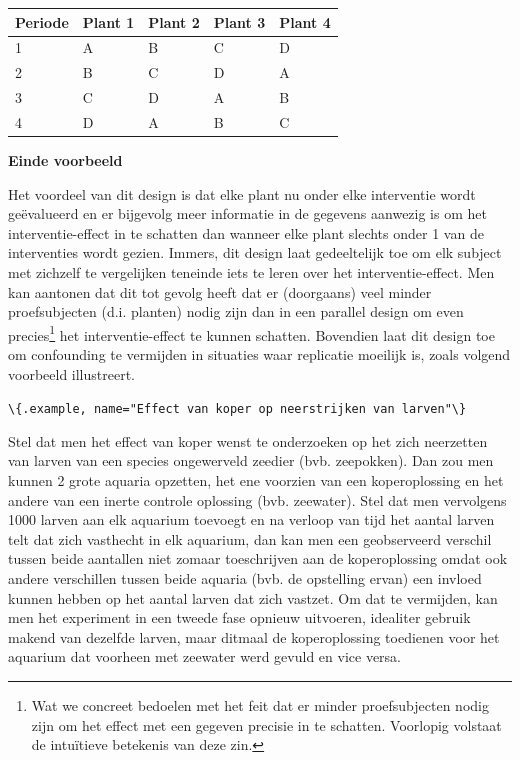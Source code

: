 \documentclass[
  12pt,dutch,coursenotes]{book}
\newcommand{\passthrough}[1]{#1}
\begin{document}
\begin{longtable}[]{@{}lllll@{}}
\toprule()
Periode & Plant 1 & Plant 2 & Plant 3 & Plant 4 \\
\midrule()
\endhead
1 & A & B & C & D \\
2 & B & C & D & A \\
3 & C & D & A & B \\
4 & D & A & B & C \\
\bottomrule()
\end{longtable}

\textbf{Einde voorbeeld}

Het voordeel van dit design is dat elke plant nu onder elke
interventie wordt geëvalueerd en er bijgevolg meer informatie in de
gegevens aanwezig is om het interventie-effect in te schatten dan wanneer
elke plant slechts onder 1 van de interventies wordt gezien. Immers, dit design laat gedeeltelijk toe om elk subject met zichzelf te vergelijken teneinde iets te leren over het interventie-effect. Men kan
aantonen dat dit tot gevolg heeft dat er (doorgaans) veel minder
proefsubjecten (d.i. planten) nodig zijn dan in een parallel design om even precies\footnote{Wat we concreet bedoelen met het feit dat er minder proefsubjecten nodig zijn
  om het effect met een gegeven precisie in te schatten. Voorlopig volstaat de intuïtieve betekenis van deze zin.} het interventie-effect te kunnen
schatten. Bovendien laat dit design toe om confounding te vermijden in situaties waar replicatie moeilijk is, zoals volgend voorbeeld illustreert.

\passthrough{\lstinline!\{.example, name="Effect van koper op neerstrijken van larven"\}!}

Stel dat men het effect van koper wenst te onderzoeken op het zich neerzetten van larven van een species ongewerveld zeedier (bvb. zeepokken). Dan zou men kunnen 2 grote aquaria opzetten, het ene voorzien van een koperoplossing en het andere van een inerte controle oplossing (bvb. zeewater). Stel dat men vervolgens 1000 larven aan elk aquarium toevoegt en na verloop van tijd het aantal larven telt dat zich vasthecht in elk aquarium, dan kan men een geobserveerd verschil tussen beide aantallen niet zomaar toeschrijven aan de koperoplossing omdat ook andere verschillen tussen beide aquaria (bvb. de opstelling ervan) een invloed kunnen hebben op het aantal larven dat zich vastzet. Om dat te vermijden, kan men het experiment in een tweede fase opnieuw uitvoeren, idealiter gebruik makend van dezelfde larven, maar ditmaal de koperoplossing toedienen voor het aquarium dat voorheen met zeewater werd gevuld en vice versa.
\end{document}
